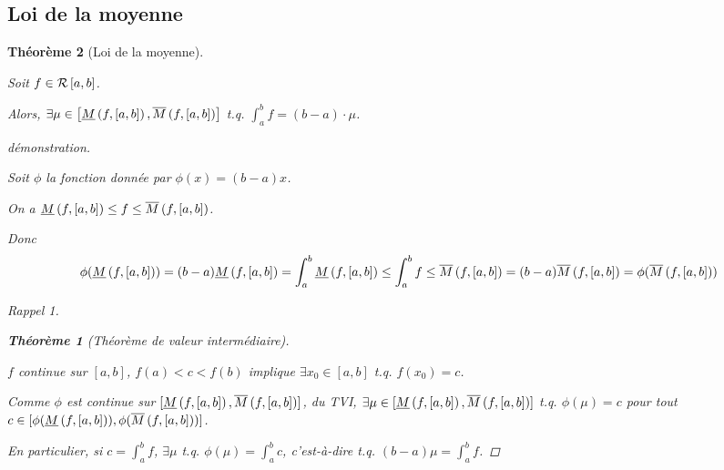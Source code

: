 \documentclass{report}
\newtheorem*{thm}{Th\'eor\`eme}
\theoremstyle{definition}
\theoremstyle{remark}
\newtheorem*{rapp}{Rappel}
\begin{document}
	\subsection{Loi de la moyenne}
	\begin{thm}[Loi de la moyenne]~

		Soit $f \in \riemann$.

		Alors, $\exists\mu \in \left[ \minf{f}[a,b], \msup{f}[a,b] \right]$ t.q. $\displaystyle\int_{a}^{b}f = (b-a) \cdot \mu$.
		\begin{proof}[d\'emonstration]~

			Soit $\phi$ la fonction donn\'ee par $\phi(x)=(b-a)x$.

			On a $\minf{f} \leq f \leq \msup{f}$.

			Donc
			\[
			\phi(\minf{f}) = (b-a)\minf{f} = \int_{a}^{b}\minf{f} \leq \int_{a}^{b}f \leq \msup{f} = (b-a)\msup{f} = \phi(\msup{f})
			\]
			\begin{rapp}
				\begin{thm}[Th\'eor\`eme de valeur interm\'ediaire]~

					$f$ continue sur $[a,b]$, $f(a)<c<f(b)$ implique $\exists x_0 \in [a,b]$ t.q. $f(x_0)=c$.
				\end{thm}
			\end{rapp}

			Comme $\phi$ est continue sur $[\minf{f},\msup{f}]$, du TVI, $\exists\mu\in[\minf{f},\msup{f}]$ t.q. $\phi(\mu)=c$ pour tout $c \in [\phi(\minf{f}),\phi(\msup{f})]$.

			En particulier, si $c=\displaystyle\int_{a}^{b}f$, $\exists\mu$ t.q. $\phi(\mu)=\displaystyle\int_{a}^{b}c$, c'est-\`a-dire t.q. $(b-a)\mu=\displaystyle\int_{a}^{b}f$.
		\end{proof}
	\end{thm}
\end{document}
